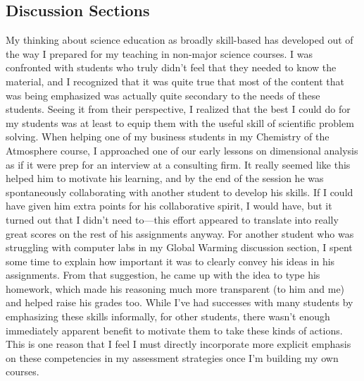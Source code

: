 \documentclass[12pt]{amsart} \usepackage{amssymb}
\begin{document}
\subsection*{Discussion Sections}
My thinking about science education as broadly skill-based has developed out of the way I prepared for my teaching in non-major science courses. I was confronted with students who truly didn't feel that they needed to know the material, and I recognized that it was quite true that most of the content that was being emphasized was actually quite secondary to the needs of these students. Seeing it from their perspective, I realized that the best I could do for my students was at least to equip them with the useful skill of scientific problem solving.  When helping one of my business students in my Chemistry of the Atmosphere course, I approached one of our early lessons on dimensional analysis as if it were prep for an interview at a consulting firm.  It really seemed like this helped him to motivate his learning, and by the end of the session he was spontaneously collaborating with another student to develop his skills.  If I could have given him extra points for his collaborative spirit, I would have, but it turned out that I didn't need to---this effort appeared to translate into really great scores on the rest of his assignments anyway.  For another student who was struggling with computer labs in my Global Warming discussion section, I spent some time to explain how important it was to clearly convey his ideas in his assignments.  From that suggestion, he came up with the idea to type his homework, which made his reasoning much more transparent (to him and me) and helped raise his grades too.  While I've had successes with many students by emphasizing these skills informally, for other students, there wasn't enough immediately apparent benefit to motivate them to take these kinds of actions.  This is one reason that I feel I must directly incorporate more explicit emphasis on these competencies in my assessment strategies once I'm building my own courses.
\end{document}
